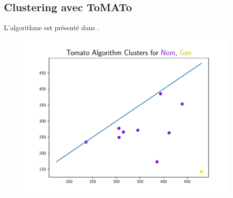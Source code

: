 \documentclass{cours}
\begin{document}
    \subsection{Clustering avec ToMATo}
    L'algorithme est présenté dans \cite{ToMATo}.
    \begin{figure}[H]
        \begin{center}
            \begin{minipage}{.5\textwidth}
                \begin{center}
                    \includegraphics[width=\linewidth]{Figures/Visualisations/tomato_Nom_Gen_Nouns}
                \end{center}
            \end{minipage}
        \end{center}


\end{figure}
\end{document}
